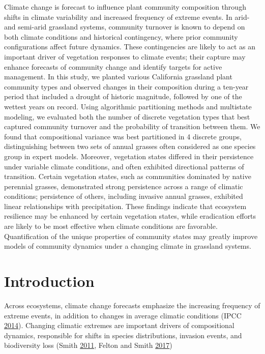 \documentclass[twoside,12pt,final]{ucthesis-CA2012}
\begin{document}
\begin{ucmainmatter}
Climate change is forecast to influence plant community composition through shifts in climate variability and increased frequency of extreme events.
In arid- and semi-arid grassland systems, community turnover is known to depend on both climate conditions and historical contingency, where prior community configurations affect future dynamics.
These contingencies are likely to act as an important driver of vegetation responses to climate events; their capture may enhance forecasts of community change and identify targets for active management.
In this study, we planted various California grassland plant community types and observed changes in their composition during a ten-year period that included a drought of historic magnitude, followed by one of the wettest years on record. Using algorithmic partitioning methods and multistate modeling, we evaluated both the number of discrete vegetation types that best captured community turnover and the probability of transition between them.
We found that compositional variance was best partitioned in 4 discrete groups, distinguishing between two sets of annual grasses often considered as one species group in expert models.
Moreover, vegetation states differed in their persistence under variable climate conditions, and often exhibited directional patterns of transition.
Certain vegetation states, such as communities dominated by native perennial grasses, demonstrated strong persistence across a range of climatic conditions;
persistence of others, including invasive annual grasses, exhibited linear relationships with precipitation.
These findings indicate that ecosystem resilience may be enhanced by certain vegetation states, while eradication efforts are likely to be most effective when climate conditions are favorable.
Quantification of the unique properties of community states may greatly improve models of community dynamics under a changing climate in grassland systems.

\hypertarget{introduction}{%
\section{Introduction}\label{introduction}}

Across ecosystems, climate change forecasts emphasize the increasing frequency of extreme events, in addition to changes in average climatic conditions (IPCC \protect\hyperlink{ref-IPCC2014}{2014}).
Changing climatic extremes are important drivers of compositional dynamics, responsible for shifts in species distributions, invasion events, and biodiversity loss (Smith \protect\hyperlink{ref-Smith2011b}{2011}, Felton and Smith \protect\hyperlink{ref-Felton2017}{2017})


\end{ucmainmatter}
\end{document}
